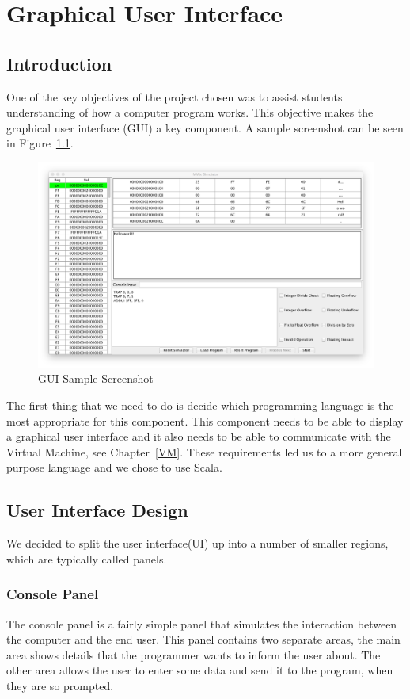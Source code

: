 \documentclass[a4paper,11pt]{report}
\begin{document}
\chapter{Graphical User Interface}
\section{Introduction}
One of the key objectives of the project chosen was to assist students understanding of how a computer program works. This objective makes the graphical user interface (GUI) a key component. A sample screenshot can be seen in Figure~\ref{screenshot}.
\begin{figure}[ht!]
\centering
\includegraphics[width=\textwidth]{GUISample2}
\caption{GUI Sample Screenshot}
\label{screenshot}
\end{figure}

The first thing that we need to do is decide which programming language is the most appropriate for this component. This component needs to be able to display a graphical user interface and it also needs to be able to communicate with the Virtual Machine, see Chapter~\ref{VM}. These requirements led us to a more general purpose language and we chose to use Scala.
\section{User Interface Design}
We decided to split the user interface(UI) up into a number of smaller regions, which are typically called panels. 
\subsection{Console Panel}
The console panel is a fairly simple panel that simulates the interaction between the computer and the end user. This panel contains two separate areas, the main area shows details that the programmer wants to inform the user about. The other area allows the user to enter some data and send it to the program, when they are so prompted.
\end{document}
